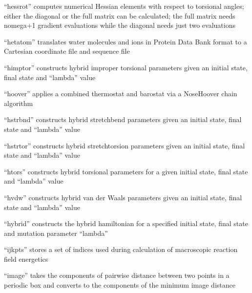 \documentclass[letterpaper,11pt,english]{sphinxmanual}
\begin{document}
“hessrot” computes numerical Hessian elements with respect
to torsional angles; either the diagonal or the full matrix
can be calculated; the full matrix needs nomega+1 gradient
evaluations while the diagonal needs just two evaluations


“hetatom” translates water molecules and ions in Protein Data
Bank format to a Cartesian coordinate file and sequence file


“himptor” constructs hybrid improper torsional parameters
given an initial state, final state and “lambda” value


“hoover” applies a combined thermostat and barostat via a
Nose\sphinxhyphen{}Hoover chain algorithm


“hstrbnd” constructs hybrid stretch\sphinxhyphen{}bend parameters given
an initial state, final state and “lambda” value


“hstrtor” constructs hybrid stretch\sphinxhyphen{}torsion parameters
given an initial state, final state and “lambda” value


“htors” constructs hybrid torsional parameters for a given
initial state, final state and “lambda” value


“hvdw” constructs hybrid van der Waals  parameters given
an initial state, final state and “lambda” value


“hybrid” constructs the hybrid hamiltonian for a specified
initial state, final state and mutation parameter “lambda”


“ijkpts” stores a set of indices used during calculation
of macroscopic reaction field energetics


“image” takes the components of pairwise distance between
two points in a periodic box and converts to the components
of the minimum image distance
\end{document}
